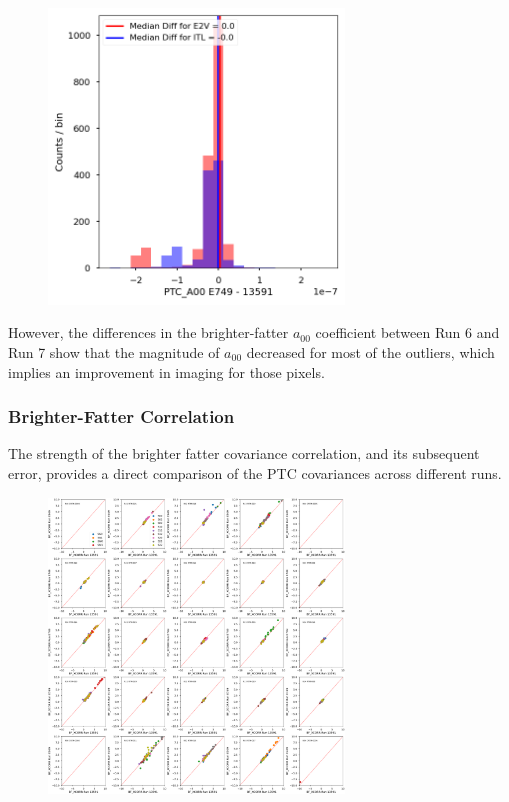 \begin{figure}[H]
\begin{centering}
\includegraphics[width=0.7\textwidth]{sections/figures/baselineCharacterization/PTC_A00_13591_E749_diff.png}
\end{centering}
\end{figure}

However, the differences in the brighter-fatter $a_{00}$ coefficient between Run 6 and
Run 7 show that the magnitude of $a_{00}$ decreased for most
of the outliers, which implies an improvement in imaging for those pixels.

\subsubsection{Brighter-Fatter Correlation}\label{brighter-fatter-correlation}

The strength of the brighter fatter covariance correlation, and its subsequent error, provides a direct comparison of the PTC covariances across different runs.

\begin{figure}[H]
\begin{centering}
\includegraphics[width=0.7\textwidth]{sections/figures/baselineCharacterization/13591_E749_BF_XCORR.png}
\end{centering}
\end{figure}

